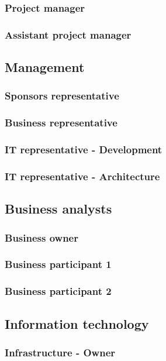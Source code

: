 \documentclass[8pt]{article} %
\begin{document}
\subsubsection{Project manager}
\subsubsection{Assistant project manager}

\subsection{Management}
\subsubsection{Sponsors representative}
\subsubsection{Business representative}
\subsubsection{IT representative - Development}
\subsubsection{IT representative - Architecture}

\subsection{Business analysts}
\subsubsection{Business owner}
\subsubsection{Business participant 1}
\subsubsection{Business participant 2}

\subsection{Information technology}
\subsubsection{Infrastructure - Owner}
\end{document}
